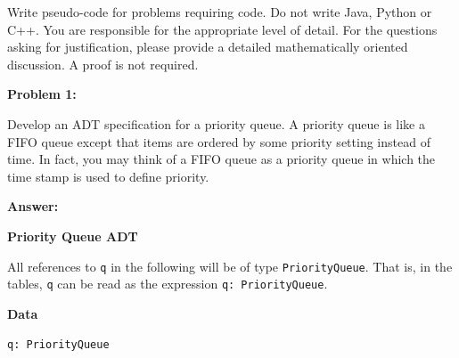 \documentclass[10pt,letterpaper,final]{report}
\begin{document}
\begin{center}
  \vline
\end{center}

Write pseudo-code for problems requiring code. Do not write Java, Python or C++. You are responsible for the appropriate level of detail.  For the questions asking for justification, please provide a detailed mathematically oriented discussion. A proof is not required.

\medskip

\noindent\textbf{Problem 1:}

Develop an ADT specification for a priority queue.  A priority queue is like a FIFO queue except that items are ordered by some priority setting instead of time. In fact, you may think of a FIFO queue as a priority queue in which the time stamp is used to define priority.

\medskip
\noindent\textbf{Answer:}
\medskip

\noindent\textbf{Priority Queue ADT}

\medskip

All references to \verb|q| in the following will be of type \verb|PriorityQueue|. That is, in the tables, \verb|q| can be read as the expression \verb|q: PriorityQueue|.

\noindent\textbf{Data}

\noindent\verb|q: PriorityQueue|
\end{document}
